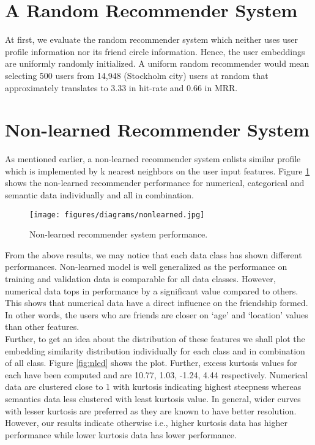 \documentclass{kththesis}
\begin{document}
\section{A Random Recommender System}
At first, we evaluate the random recommender system which neither uses user profile information nor its friend circle information. Hence, the user embeddings are uniformly randomly initialized. A uniform random recommender would mean selecting 500 users from 14,948 (Stockholm city) users at random that approximately translates to 3.33 in hit-rate and 0.66 in MRR. 
\section{Non-learned Recommender System}
As mentioned earlier, a non-learned recommender system enlists similar profile which is implemented by k nearest neighbors on the user input features. Figure \ref{fig:nl} shows the non-learned recommender performance for numerical, categorical and semantic data individually and all in combination. 

\begin{figure}[h!]
\centering
\texttt{[image: figures/diagrams/nonlearned.jpg]}
\caption{Non-learned recommender system performance.}
\label{fig:nl}
\end{figure}

From the above results, we may notice that each data class has shown different performances. Non-learned model is well generalized as the performance on training and validation data is comparable for all data classes. However, numerical data tops in performance by a significant value compared to others. This shows that numerical data have a direct influence on the friendship formed. In other words, the users who are friends are closer on `age' and `location' values than other features. \\

Further, to get an idea about the distribution of these features we shall plot the embedding similarity distribution individually for each class and in combination of all class. Figure \ref{fig:nled} shows the plot. Further, excess kurtosis values for each have been computed and are 10.77, 1.03, -1.24, 4.44 respectively. Numerical data are clustered close to 1 with kurtosis indicating highest steepness whereas semantics data less clustered with least kurtosis value. In general, wider curves with lesser kurtosis are preferred as they are known to have better resolution. However, our results indicate otherwise i.e., higher kurtosis data has higher performance while lower kurtosis data has lower performance. \\
\end{document}
